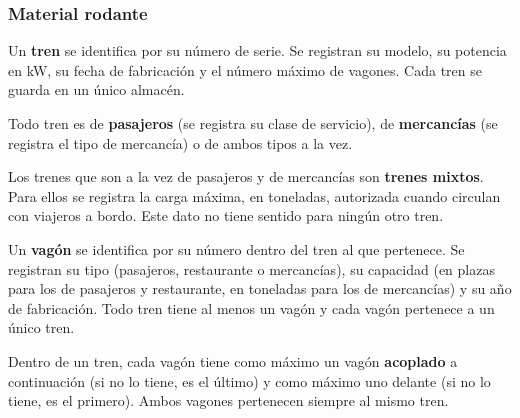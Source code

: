 \documentclass[11pt,a4paper]{article}
\DeclareRobustCommand{\_}{\textunderscore\allowbreak}
\newcommand{\RN}[1]{\textbf{RN-#1}}
\begin{document}
\subsubsection*{Material rodante}
\begin{description}[leftmargin=1.4cm,style=nextline]
\item[\RN{09}] Un \textbf{tren} se identifica por su número de serie. Se registran su modelo, su potencia en kW, su fecha de fabricación y el número máximo de vagones. Cada tren se guarda en un único almacén.
\item[\RN{10}] Todo tren es de \textbf{pasajeros} (se registra su clase de servicio), de \textbf{mercancías} (se registra el tipo de mercancía) o de ambos tipos a la vez.
\item[\RN{11}] Los trenes que son a la vez de pasajeros y de mercancías son \textbf{trenes mixtos}. Para ellos se registra la carga máxima, en toneladas, autorizada cuando circulan con viajeros a bordo. Este dato no tiene sentido para ningún otro tren.
\item[\RN{12}] Un \textbf{vagón} se identifica por su número dentro del tren al que pertenece. Se registran su tipo (pasajeros, restaurante o mercancías), su capacidad (en plazas para los de pasajeros y restaurante, en toneladas para los de mercancías) y su año de fabricación. Todo tren tiene al menos un vagón y cada vagón pertenece a un único tren.
\item[\RN{13}] Dentro de un tren, cada vagón tiene como máximo un vagón \textbf{acoplado} a continuación (si no lo tiene, es el último) y como máximo uno delante (si no lo tiene, es el primero). Ambos vagones pertenecen siempre al mismo tren.
\end{description}
\end{document}
